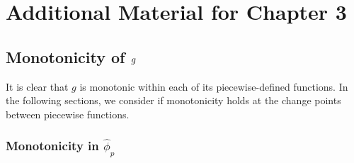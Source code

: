 \chapter{Additional Material for Chapter 3}
\graphicspath{{figures/ch_3/}}
\section{Monotonicity of \texorpdfstring{\( \MakeLowercase{g} \)}{g}}
\label{ch_3:sec:monotonicity}
It is clear that \( g \) is monotonic within each of its piecewise-defined functions.
In the following sections, we consider if monotonicity holds at the change points between piecewise functions.

\subsection{Monotonicity in \texorpdfstring{\( \hat{\phi}_p \)}{ϕp}}


